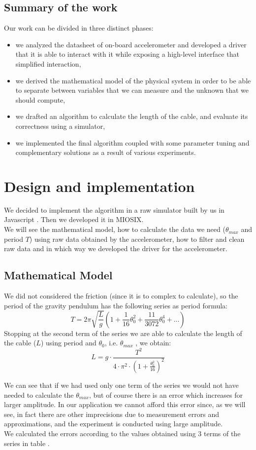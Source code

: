 \subsection{Summary of the work}
Our work can be divided in three distinct phases:
\begin{itemize}
	\item we analyzed the datasheet of on-board accelerometer and developed a driver that it is able to interact with it while exposing a high-level interface that simplified interaction,
	\item we derived the mathematical model of the physical system in order to be able to separate between variables that we can measure and the unknown that we should compute,
	\item we drafted an algorithm to calculate the length of the cable, and evaluate its correctness using a simulator,
	\item we implemented the final algorithm coupled with some parameter tuning and complementary solutions as a result of various experiments. 
\end{itemize}
\pagebreak

\section{Design and implementation}
We decided to implement the algorithm in a raw simulator built by us in Javascript \cite{javascriptPrototype}. Then we developed it in MIOSIX.\\
We will see the mathematical model, how to calculate the data we need ($\theta_{max}$ and period $T$) using raw data obtained by the accelerometer, how to filter and clean raw data and in which way we developed the driver for the accelerometer.

\subsection{Mathematical Model}
We did not considered the friction (since it is to complex to calculate), so the period of the gravity pendulum has the following series as period formula: 
$$T = 2 \pi \sqrt{\frac{L}{g}} \left(1 + \frac{1}{16} \theta_0^2 + \frac{11}{3072} \theta_0^4 + ...\right)$$
Stopping at the second term of the series we are able to calculate the length of the cable ($L$) using period and $\theta_0$, i.e. $\theta_{max}$ , we obtain:
$$ L = g \cdot \frac{T^2}{4 \cdot \pi^2 \cdot \left(1 + \frac{\theta_0^2}{16}\right)^2}$$
\par
We can see that if we had used only one term of the series we would not have needed to calculate the $\theta_{max}$, but of course there is an error which increases for larger amplitude. In our application we cannot afford this error since, as we will see, in fact there are other imprecisions due to measurement errors and approximations, and the experiment is conducted using large amplitude.\\
We calculated the errors according to the values obtained using 3 terms of the series in table .  


